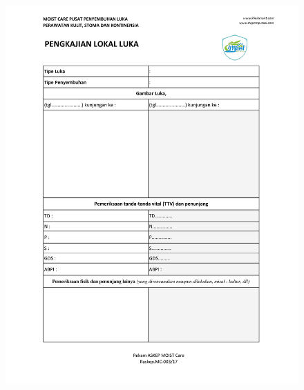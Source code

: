 \begin{figure}[H]
	\centering
	\includegraphics[keepaspectratio, width=14cm]{gambar/Format_Pengkajian-5}
	\label{gambar:Format_Pengkajian_5}
\end{figure}

